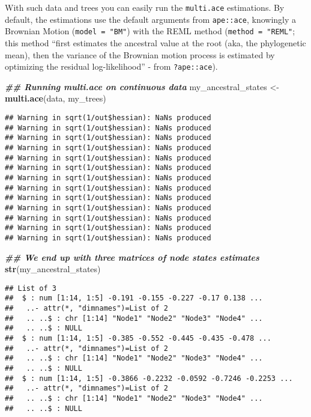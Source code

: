 \documentclass[
]{book}
\newenvironment{Shaded}{\begin{snugshade}}{\end{snugshade}}
\newcommand{\DocumentationTok}[1]{\textcolor[rgb]{0.56,0.35,0.01}{\textbf{\textit{#1}}}}
\newcommand{\FunctionTok}[1]{\textcolor[rgb]{0.13,0.29,0.53}{\textbf{#1}}}
\newcommand{\NormalTok}[1]{#1}
\newcommand{\OtherTok}[1]{\textcolor[rgb]{0.56,0.35,0.01}{#1}}
\begin{document}
With such data and trees you can easily run the \texttt{multi.ace} estimations.
By default, the estimations use the default arguments from \texttt{ape::ace}, knowingly a Brownian Motion (\texttt{model\ =\ "BM"}) with the REML method (\texttt{method\ =\ "REML"}; this method ``first estimates the ancestral value at the root (aka, the phylogenetic mean), then the variance of the Brownian motion process is estimated by optimizing the residual log-likelihood'' - from \texttt{?ape::ace}).

\begin{Shaded}
\begin{Highlighting}[]
\DocumentationTok{\#\# Running multi.ace on continuous data}
\NormalTok{my\_ancestral\_states }\OtherTok{\textless{}{-}} \FunctionTok{multi.ace}\NormalTok{(data, my\_trees)}
\end{Highlighting}
\end{Shaded}

\begin{verbatim}
## Warning in sqrt(1/out$hessian): NaNs produced
## Warning in sqrt(1/out$hessian): NaNs produced
## Warning in sqrt(1/out$hessian): NaNs produced
## Warning in sqrt(1/out$hessian): NaNs produced
## Warning in sqrt(1/out$hessian): NaNs produced
## Warning in sqrt(1/out$hessian): NaNs produced
## Warning in sqrt(1/out$hessian): NaNs produced
## Warning in sqrt(1/out$hessian): NaNs produced
## Warning in sqrt(1/out$hessian): NaNs produced
## Warning in sqrt(1/out$hessian): NaNs produced
## Warning in sqrt(1/out$hessian): NaNs produced
## Warning in sqrt(1/out$hessian): NaNs produced
## Warning in sqrt(1/out$hessian): NaNs produced
\end{verbatim}

\begin{Shaded}
\begin{Highlighting}[]
\DocumentationTok{\#\# We end up with three matrices of node states estimates}
\FunctionTok{str}\NormalTok{(my\_ancestral\_states)}
\end{Highlighting}
\end{Shaded}

\begin{verbatim}
## List of 3
##  $ : num [1:14, 1:5] -0.191 -0.155 -0.227 -0.17 0.138 ...
##   ..- attr(*, "dimnames")=List of 2
##   .. ..$ : chr [1:14] "Node1" "Node2" "Node3" "Node4" ...
##   .. ..$ : NULL
##  $ : num [1:14, 1:5] -0.385 -0.552 -0.445 -0.435 -0.478 ...
##   ..- attr(*, "dimnames")=List of 2
##   .. ..$ : chr [1:14] "Node1" "Node2" "Node3" "Node4" ...
##   .. ..$ : NULL
##  $ : num [1:14, 1:5] -0.3866 -0.2232 -0.0592 -0.7246 -0.2253 ...
##   ..- attr(*, "dimnames")=List of 2
##   .. ..$ : chr [1:14] "Node1" "Node2" "Node3" "Node4" ...
##   .. ..$ : NULL
\end{verbatim}
\end{document}
